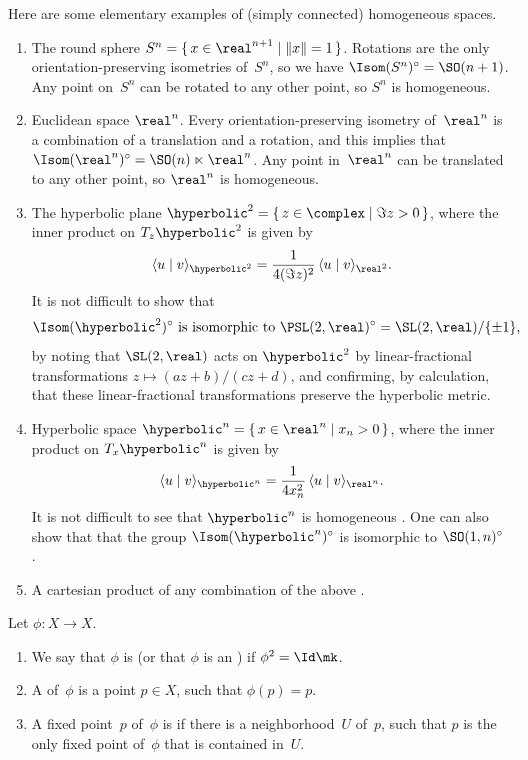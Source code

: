 \begin{egs}
 Here are some elementary examples of (simply connected) homogeneous
spaces.
 \begin{enumerate} \itemsep=\smallskipamount
 
 \item The round sphere $S^n 
 = \{\, x \in \real^{n+1} \mid \|x\| = 1 \,\}$. Rotations are the only
orientation-preserving isometries of~$S^n$, so we have $\Isom(S^n)^\circ =
\SO(n+1)$. Any point on~$S^n$ can be rotated to any other point, so
$S^n$ is homogeneous.

 \item Euclidean space $\real^n$. Every
orientation-preserving isometry of~$\real^n$ is a combination of a
translation and a rotation, and this implies that $\Isom(\real^n)^\circ = \SO(n) \ltimes
\real^n$. Any point in~$\real^n$ can be
translated to any other point, so $\real^n$ is homogeneous. 

 \item The hyperbolic plane $\hyperbolic^2
 = \{\, z \in \complex \mid \Im z > 0 \,\}$,
 where the inner product on $T_z \hyperbolic^2$ is given by
 $$ \langle u \mid v \rangle_{\hyperbolic^2}
 = \frac{1}{4(\Im z)^2} \, \langle u \mid v \rangle_{\real^2} .$$
 It is not difficult to show that 
 	$$  \text{$\Isom(\hyperbolic^2)^\circ$ is isomorphic to 
	$\PSL(2,\real)^\circ = \SL(2,\real)/\{\pm 1\}$,} $$
by noting that
$\SL(2,\real)$ acts on $\hyperbolic^2$ by linear-fractional
transformations $z \mapsto (az+b)/(cz+d)$, and confirming, by
calculation, that these linear-fractional transformations preserve
the hyperbolic metric.

 \item Hyperbolic space
 $\hyperbolic^n = \{\, x \in \real^n \mid x_n > 0 \,\}$,
 where the inner product on $T_x \hyperbolic^n$ is given by
 $$ \langle u \mid v \rangle_{\hyperbolic^n}
 = \frac{1}{4x_n^2} \, \langle u \mid v \rangle_{\real^n} .$$
 It is not difficult to see that $\hyperbolic^n$ is homogeneous
. One can also show that that
the group $\Isom(\hyperbolic^n)^\circ$ is isomorphic to
$\SO(1,n)^\circ$ .
 \item A cartesian product of any combination of the above
.
 \end{enumerate}
 \end{egs}

\begin{defns}
 Let $\phi \colon X \to X$.
 \begin{enumerate}
 \item We say that $\phi$ is  (or that $\phi$ is an ) if
$\phi^2 = \Id\mk$.
 \item A  of~$\phi$ is a point $p \in X$, such that
$\phi(p) = p$.
 \item A fixed point~$p$ of~$\phi$ is  if there is a neighborhood~$U$ of~$p$, such that $p$
is the only fixed point of~$\phi$ that is contained in~$U$.
 \end{enumerate}
 \end{defns}

